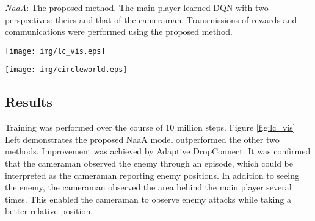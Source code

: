 {\em NaaA}: The proposed method. The main player learned DQN with two perspectives: theirs and that of the cameraman.
Transmissions of rewards and communications were performed using the proposed method.

\begin{figure*}[t]
\centering
\texttt{[image: img/lc\_vis.eps]}
\caption{
	\textbf{Left:}
		Learning curve for ViZDoom multi-agent task. 
		The proposed NaaA--based method outperformed the other two methods (baseline and Comm DQNs).
	\textbf{Right:} 
		Visualizing reward from the main player to the cameramann shows us what is important information for the main player:
		(a) The pistol.
		(b) The point at which the enemy appeared and approached.
}
\label{fig:lc_vis}
\end{figure*}

\begin{figure*}[t]
\centering
\texttt{[image: img/circleworld.eps]}
\caption{
NaaA leads agents to enter a cooperative relationship.
First, the two agents face different directions,
and the cameraman sells their information to the main player (\textbf{1}).
The main player (information buyer) starts to turn right to find the enemy.
The cameraman (information seller) starts to turn left to seek new information by finding the blind area of the main player (\textbf{2} and \textbf{3}).
After turning, the main player attacks the first, having already identified enemy (\textbf{4} and \textbf{5}).
Once the main player finds the enemy, he attacks and obtains the reward (\textbf{6} and \textbf{7}).
Both agents then return to watching the dead area of the other until the next enemy appears (\textbf{8}).
}
\label{fig:circleworld}
\end{figure*}

\subsection{Results}
Training was performed over the course of 10 million steps.
Figure \ref{fig:lc_vis} Left demonstrates the proposed NaaA model outperformed the other two methods.
Improvement was achieved by Adaptive DropConnect.
It was confirmed that the cameraman observed the enemy through an episode, which could be interpreted as the cameraman reporting enemy positions.
In addition to seeing the enemy, the cameraman observed the area behind the main player several times.
This enabled the cameraman to observe enemy attacks while taking a better relative position.

